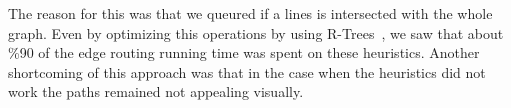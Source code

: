 \documentclass{gd-llncs}
\newcommand{\comm}[1]{}
\begin{document}
\label{fig:shortcut}  

The reason for this was that we queured if a lines is intersected with the whole graph. Even by optimizing this operations by using R-Trees~\cite{guttman1984r}, we saw that about \%90 of the edge routing running time was spent on these heuristics. Another shortcoming of this approach was that in the case when the heuristics did not work the paths remained not appealing visually. 


\comm{
\section{Further Examples}
}
 

\end{document}
